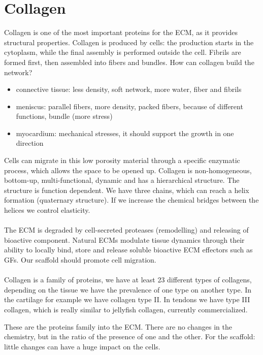\section{Collagen}
Collagen is one of the most important proteins for the ECM, as it provides structural properties. Collagen is produced by cells: the production starts in the cytoplasm,  while the final assembly is performed outside the cell.
Fibrils are formed first, then assembled into fibers and bundles.
\noindent
How can collagen build the network?
\begin{itemize}
\item connective tissue: less density, soft network, more water, fiber and fibrils
\item meniscus: parallel fibers, more density, packed fibers, because of different functions, bundle (more stress)
\item myocardium: mechanical stresses, it should support the growth in one direction
\end{itemize}
\noindent
Cells can migrate in this low porosity material through a specific enzymatic process,  which allows the space to be opened up.
Collagen is non-homogeneous, bottom-up, multi-functional, dynamic and has a hierarchical structure. The structure is function dependent.
We have three chains,  which can reach a helix formation (quaternary structure). If we increase the chemical bridges between the helices we control elasticity.
\\
\\
\noindent
The ECM is degraded by cell-secreted proteases (remodelling) and releasing of bioactive component.
Natural ECMs modulate tissue dynamics through their ability to locally bind, store and release soluble bioactive ECM effectors such as GFs.
Our scaffold should promote cell migration.
\\
\\
\noindent
Collagen is a family of proteins, we have at least 23 different types of collagens, depending on the tissue we have the prevalence of one type on another type. In the cartilage for example we have collagen type II. In tendons we have type III collagen, which is really similar to jellyfish collagen, currently commercialized.

These are the proteins family into the ECM.
There are no changes in the chemistry, but in the ratio of the presence of one and the other.
For the scaffold: little changes can have a huge impact on the cells.

